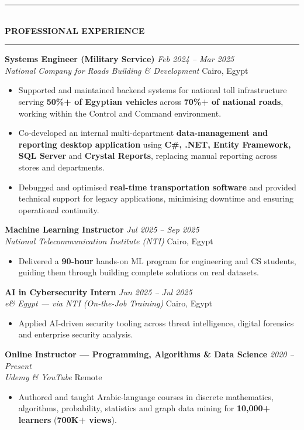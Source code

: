 \documentclass[10pt, a4paper]{article}
\newcommand{\cvsection}[1]{%
  \vspace{3pt}%
  {\color{navy}\rule{\linewidth}{1.1pt}}\\[0.5pt]%
  {\color{navy}\bfseries\fontsize{9.5}{11}\selectfont\uppercase{#1}}\\[-4pt]%
  {\color{teal}\rule{\linewidth}{0.6pt}}%
  \vspace{2pt}%
}
\newcommand{\cventry}[4]{%
  \vspace{2.5pt}%
  \textbf{\color{darkgray}#1} \hfill {\color{midgray}\textit{#3}}\\[-1.5pt]%
  {\color{teal}\textit{#2}} \hfill {\color{midgray}#4}%
}
\newenvironment{cvitems}{%
  \begin{itemize}[leftmargin=11pt, itemsep=0.5pt, parsep=0pt, topsep=1pt,
                  label={\textcolor{teal}{$\bullet$}}]
}{%
  \end{itemize}%
}
\begin{document}
\cvsection{Professional Experience}

\cventry{Systems Engineer (Military Service)}{National Company for Roads Building \& Development}
        {Feb 2024 -- Mar 2025}{Cairo, Egypt}
\begin{cvitems}
  \item Supported and maintained backend systems for national toll infrastructure serving \textbf{50\%+ of Egyptian vehicles} across \textbf{70\%+ of national roads}, working within the Control and Command environment.
  \item Co-developed an internal multi-department \textbf{data-management and reporting desktop application} using \textbf{C\#, .NET, Entity Framework, SQL Server} and \textbf{Crystal Reports}, replacing manual reporting across stores and departments.
  \item Debugged and optimised \textbf{real-time transportation software} and provided technical support for legacy applications, minimising downtime and ensuring operational continuity.
\end{cvitems}

\cventry{Machine Learning Instructor}{National Telecommunication Institute (NTI)}
        {Jul 2025 -- Sep 2025}{Cairo, Egypt}
\begin{cvitems}
  \item Delivered a \textbf{90-hour} hands-on ML program for engineering and CS students, guiding them through building complete solutions on real datasets.
\end{cvitems}

\cventry{AI in Cybersecurity Intern}{e\& Egypt --- via NTI (On-the-Job Training)}
        {Jun 2025 -- Jul 2025}{Cairo, Egypt}
\begin{cvitems}
  \item Applied AI-driven security tooling across threat intelligence, digital forensics and enterprise security analysis.
\end{cvitems}

\cventry{Online Instructor --- Programming, Algorithms \& Data Science}{Udemy \& YouTube}
        {2020 -- Present}{Remote}
\begin{cvitems}
  \item Authored and taught Arabic-language courses in discrete mathematics, algorithms, probability, statistics and graph data mining for \textbf{10,000+ learners} (\textbf{700K+ views}).
\end{cvitems}
\end{document}
